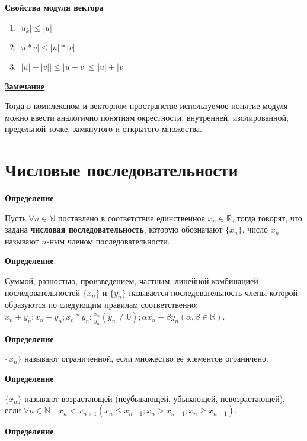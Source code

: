 \documentclass{article}
\newcommand{\parspace}{\vspace{10pt}}
\begin{document}
\pagebreak

\textbf{Свойства модуля вектора}

\begin{enumerate}
    \item $|u_k| \le |u|$
    \item $|u * v| \le |u| * |v|$
    \item $\big||u| - |v|\big| \le |u \pm v| \le |u| + |v|$
\end{enumerate}

\parspace

\underline{\textbf{Замечание}}

Тогда в комплексном и векторном пространстве используемое понятие модуля
можно ввести аналогично понятиям окрестности, внутренней, изолированной,
предельной точке, замкнутого и открытого множества.

\section{Числовые последовательности}

\textbf{Определение}.

Пусть $\forall n \in \mathbb{N}$ поставлено в соответствие единственное $x_n \in \mathbb{R}$,
тогда говорят, что задана \textbf{числовая последовательность}, которую обозначают
$\{x_n\}$, число $x_n$ называют $n$-ным членом последовательности.

\parspace

\textbf{Определение}.

Суммой, разностью, произведением, частным, линейной комбинацией последовательностей 
$\{x_n\}$ и $\{y_n\}$ называется последовательность члены которой образуются 
по следующим правилам соответственно: 
$x_n + y_n; x_n - y_n; x_n * y_n; \frac{x_n}{y_n} (y_n \ne 0); \alpha x_n + \beta y_n (\alpha, \beta \in \mathbb{R})$.

\parspace

\textbf{Определение}.

$\{x_n\}$ называют ограниченной, если множество её элементов ограничено.

\parspace

\textbf{Определение}.

$\{x_n\}$ называют возрастающей (неубывающей, убывающей, невозрастающей), если
$\forall n \in \mathbb{N} \quad x_n < x_{n + 1} (x_n \le x_{n + 1}; x_n > x_{n + 1}; x_n \ge x_{n + 1})$.

\parspace

\textbf{Определение}.
\end{document}
